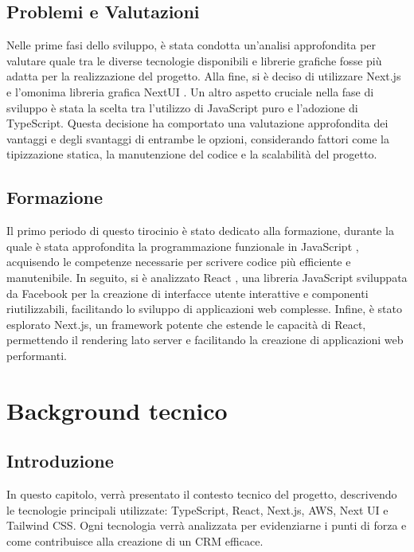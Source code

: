 \documentclass[target=bach,aauheader=,style=]{thud}
\begin{document}
\section{Problemi e Valutazioni}
Nelle prime fasi dello sviluppo, è stata condotta un'analisi approfondita per valutare quale tra le diverse tecnologie disponibili e librerie grafiche fosse più adatta per la realizzazione del progetto. Alla fine, si è deciso di utilizzare Next.js \cite{nextjs2024} e l'omonima libreria grafica NextUI \cite{nextui2024}. Un altro aspetto cruciale nella fase di sviluppo è stata la scelta tra l'utilizzo di JavaScript puro e l'adozione di TypeScript. Questa decisione ha comportato una valutazione approfondita dei vantaggi e degli svantaggi di entrambe le opzioni, considerando fattori come la tipizzazione statica, la manutenzione del codice e la scalabilità del progetto.

\section{Formazione}
Il primo periodo di questo tirocinio è stato dedicato alla formazione, durante la quale è stata approfondita la programmazione funzionale in JavaScript \cite{knowthen2024}, acquisendo le competenze necessarie per scrivere codice più efficiente e manutenibile. In seguito, si è analizzato React \cite{udemyreactredux2024}, una libreria JavaScript sviluppata da Facebook per la creazione di interfacce utente interattive e componenti riutilizzabili, facilitando lo sviluppo di applicazioni web complesse. Infine, è stato esplorato Next.js, un framework potente che estende le capacità di React, permettendo il rendering lato server e facilitando la creazione di applicazioni web performanti.

\chapter{Background tecnico}

\section{Introduzione}
In questo capitolo, verrà presentato il contesto tecnico del progetto, descrivendo le tecnologie principali utilizzate: TypeScript, React, Next.js, AWS, Next UI e Tailwind CSS. Ogni tecnologia verrà analizzata per evidenziarne i punti di forza e come contribuisce alla creazione di un CRM efficace.
\end{document}
